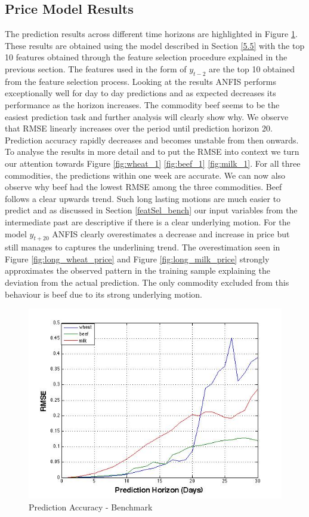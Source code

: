 \subsection{Price Model Results}

The prediction results across different time horizons are highlighted in Figure \ref{fig:res_1}. These results are obtained using the model described in Section \ref{5.5} with the top 10 features obtained through the feature selection procedure explained in the previous section. The features used in the form of $y_{t-2}$ are the top 10 obtained from the feature selection process. 
 Looking at the results ANFIS performs exceptionally well for day to day predictions and as expected decreases its performance as the horizon increases. The commodity beef seems to be the easiest prediction task and further analysis will clearly show why.   We observe that RMSE linearly increases over the period until prediction horizon 20. Prediction accuracy rapidly decreases and becomes unstable from then onwards. To analyse the results in more detail and to put the RMSE into context  we turn our attention towards Figure \ref{fig:wheat_1} \ref{fig:beef_1} \ref{fig:milk_1}. For all three commodities, the predictions within one week are accurate. We can now also observe why beef had the lowest RMSE among the three commodities. Beef follows a clear upwards trend. Such long lasting motions are much easier to predict and as discussed in Section \ref{featSel_bench} our input variables from the intermediate past are descriptive if there is a clear underlying motion. 
For the model $y_{t+20}$  ANFIS clearly overestimates a decrease and increase in price but still manages to captures the underlining trend. The overestimation seen in Figure \ref{fig:long_wheat_price} and Figure \ref{fig:long_milk_price} strongly approximates the observed pattern in the training sample explaining the deviation from the actual prediction. The only commodity excluded from this behaviour is beef due to its strong underlying motion. 





\begin{figure}[H]
        \centering
         \includegraphics[width=.66\textwidth ]{img/model/prediction_days_1}      
        \caption{Prediction Accuracy - Benchmark }
        \label{fig:res_1}
\end{figure}




